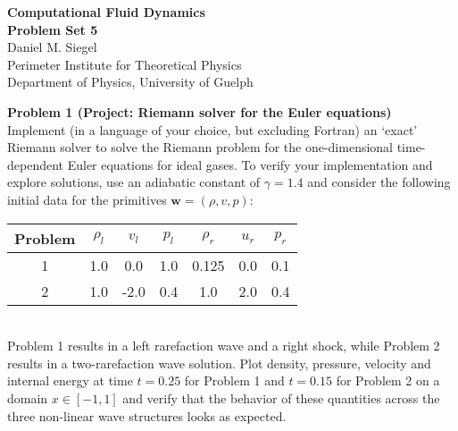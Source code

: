 \documentclass[letter,11pt]{article}
\begin{document}
\pagestyle{problem_set}


\phantom{.}
\begin{center}
{\Large\textbf{Computational Fluid Dynamics\\[0.4cm] Problem Set 5}} \\[0.7cm]
Daniel M. Siegel \\[0.1cm]
Perimeter Institute for Theoretical Physics\\
Department of Physics, University of Guelph
\end{center}

\vspace{1cm}

{\noindent\large\textbf{Problem 1 (Project: Riemann solver for the Euler equations)}}\\[0.1cm]

\noindent Implement (in a language of your choice, but excluding Fortran) an `exact' Riemann solver to solve the Riemann problem for the one-dimensional time-dependent Euler equations for ideal gases. To verify your implementation and explore solutions, use an adiabatic constant of $\gamma=1.4$ and consider the following initial data for the primitives $\mathbf{w}=(\rho,v,p)$:\\

\begin{tabular}{c|c|c|c|c|c|c}
  Problem & $\rho_l$ & $v_l$ & $p_l$ & $\rho_r$ & $u_r$ & $p_r$ \\
  \hline
  1 & 1.0 & 0.0 & 1.0 & 0.125 & 0.0 & 0.1 \\
  2 & 1.0 & -2.0 & 0.4 & 1.0 & 2.0 & 0.4 \\
\end{tabular}\\

\noindent Problem 1 results in a left rarefaction wave and a right shock, while Problem 2 results in a two-rarefaction wave solution. Plot density, pressure, velocity and internal energy at time $t = 0.25$ for Problem 1 and $t=0.15$ for Problem 2 on a domain $x\in [-1,1]$ and verify that the behavior of these quantities across the three non-linear wave structures looks as expected.\\
\end{document}
